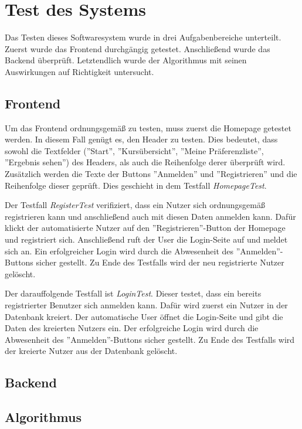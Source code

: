 \chapter{Test des Systems}
\label{chapter:testing}

	Das Testen dieses Softwaresystem wurde in drei Aufgabenbereiche unterteilt.
	Zuerst wurde das Frontend durchgängig getestet.
	Anschließend wurde das Backend überprüft.
	Letztendlich wurde der Algorithmus mit seinen Auswirkungen auf Richtigkeit untersucht.
	
	\section{Frontend}
		Um das Frontend ordnungsgemäß zu testen, muss zuerst die Homepage getestet werden.
		In diesem Fall genügt es, den Header zu testen.
		Dies bedeutet, dass sowohl die Textfelder (''Start'', ''Kursübersicht'', ''Meine Präferenzliste'', ''Ergebnis sehen'') des Headers, als auch die Reihenfolge derer überprüft wird.
		Zusätzlich werden die Texte der Buttons ''Anmelden'' und ''Registrieren'' und die Reihenfolge dieser geprüft.
		Dies geschieht in dem Testfall \textit{HomepageTest}.\newline
		
		Der Testfall \textit{RegisterTest} verifiziert, dass ein Nutzer sich ordnungsgemäß registrieren kann und anschließend auch mit diesen Daten anmelden kann.
		Dafür klickt der automatisierte Nutzer auf den ''Registrieren''-Button der Homepage und registriert sich.
		Anschließend ruft der User die Login-Seite auf und meldet sich an.
		Ein erfolgreicher Login wird durch die Abwesenheit des ''Anmelden''-Buttons sicher gestellt.
		Zu Ende des Testfalls wird der neu registrierte Nutzer gelöscht.
		
		Der darauffolgende Testfall ist \textit{LoginTest}.
		Dieser testet, dass ein bereits registrierter Benutzer sich anmelden kann.
		Dafür wird zuerst ein Nutzer in der Datenbank kreiert.
		Der automatische User öffnet die Login-Seite und gibt die Daten des kreierten Nutzers ein.
		Der erfolgreiche Login wird durch die Abwesenheit des ''Anmelden''-Buttons sicher gestellt.
		Zu Ende des Testfalls wird der kreierte Nutzer aus der Datenbank gelöscht.
					
	\section{Backend}
	
	\section{Algorithmus}
	
